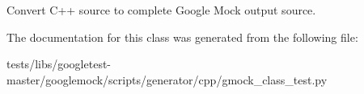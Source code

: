 \begin{DoxyVerb}Convert C++ source to complete Google Mock output source.\end{DoxyVerb}
 

The documentation for this class was generated from the following file\+:\begin{DoxyCompactItemize}
\item 
tests/libs/googletest-\/master/googlemock/scripts/generator/cpp/gmock\+\_\+class\+\_\+test.\+py\end{DoxyCompactItemize}
